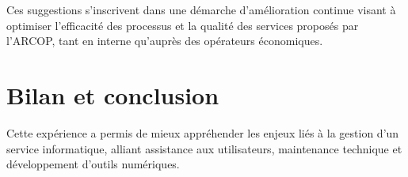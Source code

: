 Ces suggestions s'inscrivent dans une démarche d'amélioration continue visant à optimiser l'efficacité des processus et la qualité des services proposés par l'ARCOP, tant en interne qu'auprès des opérateurs économiques.




\section{Bilan et conclusion}
Cette expérience a permis de mieux appréhender les enjeux liés à la gestion d’un service informatique, alliant assistance aux utilisateurs, maintenance technique et développement d’outils numériques.

\clearpage
